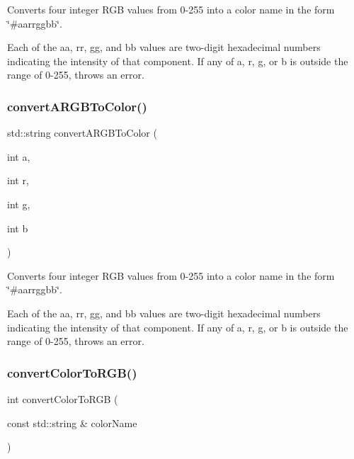 Converts four integer R\+GB values from 0-\/255 into a color name in the form {\ttfamily \char`\"{}\#aarrggbb\char`\"{}}. 

Each of the {\ttfamily aa}, {\ttfamily rr}, {\ttfamily gg}, and {\ttfamily bb} values are two-\/digit hexadecimal numbers indicating the intensity of that component. If any of a, r, g, or b is outside the range of 0-\/255, throws an error. \mbox{\label{classGColor_abc3a0188f264217b768e4a9a63fbc54e}} 
\subsubsection{\texorpdfstring{convert\+A\+R\+G\+B\+To\+Color()}{convertARGBToColor()}}
{\footnotesize\ttfamily std\+::string convert\+A\+R\+G\+B\+To\+Color (\begin{DoxyParamCaption}\item[{int}]{a,  }\item[{int}]{r,  }\item[{int}]{g,  }\item[{int}]{b }\end{DoxyParamCaption})\hspace{0.3cm}{\ttfamily [static]}}



Converts four integer R\+GB values from 0-\/255 into a color name in the form {\ttfamily \char`\"{}\#aarrggbb\char`\"{}}. 

Each of the {\ttfamily aa}, {\ttfamily rr}, {\ttfamily gg}, and {\ttfamily bb} values are two-\/digit hexadecimal numbers indicating the intensity of that component. If any of a, r, g, or b is outside the range of 0-\/255, throws an error. \mbox{\label{classGColor_aab4a1480d396f913220aea51d117eb94}} 
\subsubsection{\texorpdfstring{convert\+Color\+To\+R\+G\+B()}{convertColorToRGB()}}
{\footnotesize\ttfamily int convert\+Color\+To\+R\+GB (\begin{DoxyParamCaption}\item[{const std\+::string \&}]{color\+Name }\end{DoxyParamCaption})\hspace{0.3cm}{\ttfamily [static]}}



